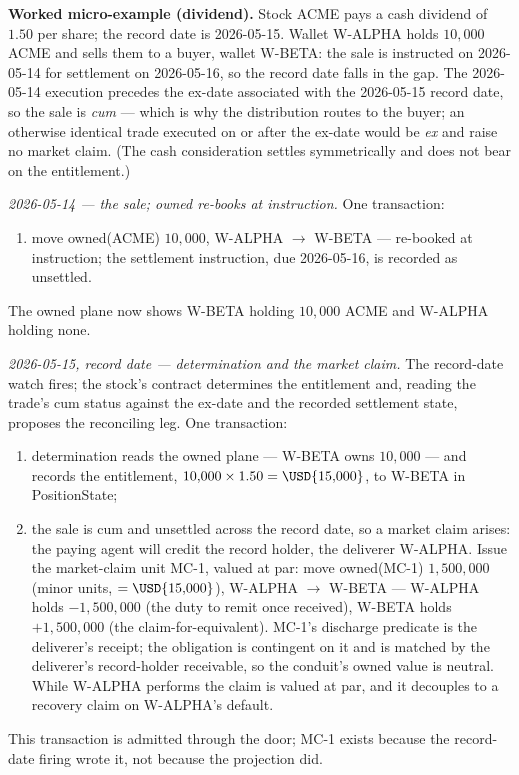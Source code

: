 \medskip\noindent\textbf{Worked micro-example (dividend).} Stock ACME pays a cash
dividend of $1.50$ per share; the record date is 2026-05-15. Wallet W-ALPHA holds
$10{,}000$ ACME and sells them to a buyer, wallet W-BETA: the sale is instructed on
2026-05-14 for settlement on 2026-05-16, so the record date falls in the gap. The
2026-05-14 execution precedes the ex-date associated with the 2026-05-15 record date,
so the sale is \emph{cum} --- which is why the distribution routes to the buyer; an
otherwise identical trade executed on or after the ex-date would be \emph{ex} and raise
no market claim. (The cash consideration settles symmetrically and does not bear on the
entitlement.)

\emph{2026-05-14 --- the sale; owned re-books at instruction.} One transaction:
\begin{enumerate}[label=(\arabic*),nosep]
\item move owned(ACME) $10{,}000$, W-ALPHA $\to$ W-BETA --- re-booked at
instruction; the settlement instruction, due 2026-05-16, is recorded as unsettled.
\end{enumerate}
The owned plane now shows W-BETA holding $10{,}000$ ACME and W-ALPHA holding none.

\emph{2026-05-15, record date --- determination and the market claim.} The
record-date watch fires; the stock's contract determines the entitlement and, reading
the trade's cum status against the ex-date and the recorded settlement state, proposes
the reconciling leg. One transaction:
\begin{enumerate}[label=(\arabic*),nosep]
\item determination reads the owned plane --- W-BETA owns $10{,}000$ --- and records
the entitlement, $10{,}000 \times 1.50 = \USD{15{,}000}$, to W-BETA in PositionState;
\item the sale is cum and unsettled across the record date, so a market claim arises:
the paying agent will credit the record holder, the deliverer W-ALPHA. Issue the
market-claim unit MC-1,
valued at par: move owned(MC-1) $1{,}500{,}000$ (minor units, $=\USD{15{,}000}$),
W-ALPHA $\to$ W-BETA --- W-ALPHA holds $-1{,}500{,}000$ (the duty to remit once
received), W-BETA holds $+1{,}500{,}000$ (the claim-for-equivalent). MC-1's discharge
predicate is the deliverer's receipt; the obligation is contingent on it and is
matched by the deliverer's record-holder receivable, so the conduit's owned value is
neutral. While W-ALPHA performs the claim is valued at par, and it decouples to a
recovery claim on W-ALPHA's default.
\end{enumerate}
This transaction is admitted through the door; MC-1 exists because the record-date
firing wrote it, not because the projection did.

